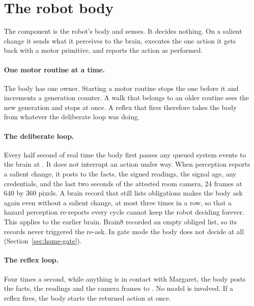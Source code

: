 \section{The robot body}\label{sec:home-body}

The component  is the robot's body and senses. It decides nothing. On a salient
change it sends what it perceives to the brain, executes the one action it gets back with a motor
primitive, and reports the action as performed.

\paragraph{One motor routine at a time.} The body has one owner. Starting a motor routine stops the
one before it and increments a generation counter. A walk that belongs to an older routine sees the
new generation and stops at once. A reflex that fires therefore takes the body from whatever the
deliberate loop was doing.

\paragraph{The deliberate loop.} Every half second of real time the body first passes any queued
system events to the brain at . It does not interrupt an action under way. When
perception reports a salient change, it posts to  the facts, the signed readings, the
signal age, any credentials, and the last two seconds of the attested room camera, 24 frames at 640
by 360 pixels. A brain record that still lists obligations makes the body ask again even without a
salient change, at most three times in a row, so that a hazard perception re-reports every cycle
cannot keep the robot deciding forever. This applies to the earlier brain. Brain8
recorded an empty obliged list, so its records never triggered the re-ask. In gate mode the body
does not decide at all (Section~\ref{sec:home-gate}).

\paragraph{The reflex loop.} Four times a second, while anything is in contact with Margaret, the body
posts the facts, the readings and the camera frames to . No model is involved. If a
reflex fires, the body starts the returned action at once.

